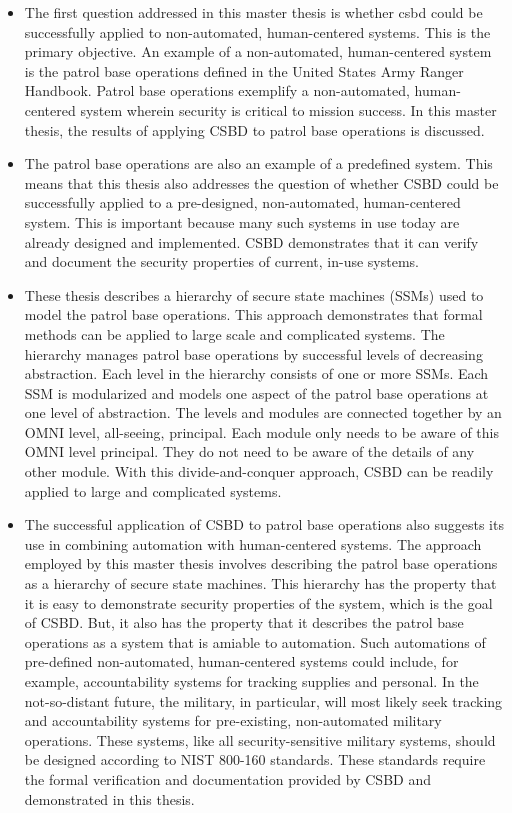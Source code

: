 \documentclass[../../main/main.tex]{subfiles}
\begin{document}
\begin{itemize}
\item The first question addressed in this master thesis is whether \gls{csbd} could be successfully applied to non-automated, human-centered systems.  This is the primary objective.  An example of a non-automated, human-centered system is the patrol base operations defined in the United States Army Ranger Handbook\cite{rangermanual}.   Patrol base operations exemplify a non-automated, human-centered system wherein security is critical to mission success.  In this master thesis, the results of applying CSBD to patrol base operations is discussed. 

\item The patrol base operations are also an example of a predefined system.  This means that this thesis also addresses the question of whether CSBD could be successfully applied to a pre-designed, non-automated, human-centered system.  This is important because many such systems in use today are already designed and implemented.  CSBD demonstrates that it can verify and document the security properties of current, in-use systems.  

\item These thesis describes a hierarchy of secure state machines (SSMs) used to model the patrol base operations.  This approach demonstrates that formal methods can be applied to large scale and complicated systems.  The hierarchy manages patrol base operations by successful levels of decreasing abstraction.  Each level in the hierarchy consists of one or more SSMs.  Each SSM is modularized and models one aspect of the patrol base operations at one level of abstraction.  The levels and modules are connected together by an OMNI level, all-seeing, principal.  Each module only needs to be aware of this OMNI level principal.  They do not need to be aware of the details of any other module.  With this divide-and-conquer approach, CSBD can be readily applied to large and complicated systems.

\item The successful application of CSBD to patrol base operations also suggests its use in combining automation with human-centered systems.  The approach employed by this master thesis involves describing the patrol base operations as a hierarchy of secure state machines.  This hierarchy has the property that it is easy to demonstrate security properties of the system, which is the goal of CSBD.  But, it also has the property that it describes the patrol base operations as a system that is amiable to automation.  Such automations of pre-defined non-automated, human-centered systems could include, for example, accountability systems for tracking supplies and personal.  In the not-so-distant future, the military, in particular, will most likely seek tracking and accountability systems for pre-existing, non-automated military operations.  These systems, like all security-sensitive military systems, should be designed according to NIST 800-160 standards.  These standards require the formal verification and documentation provided by CSBD and demonstrated in this thesis.   

\end{itemize}
\end{document}
